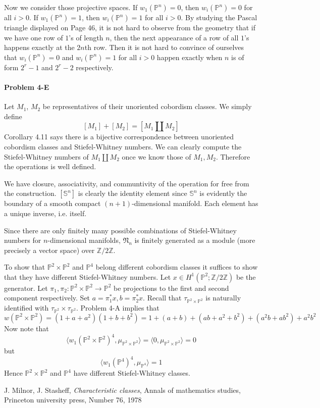 \documentclass[12pt]{article}
\theoremstyle{plain}
\theoremstyle{definition}
\newcommand{\IP}{\mathbb{P}}
\newcommand{\IS}{\mathbb{S}}
\newcommand{\IZ}{\mathbb{Z}}
\newcommand{\<}{\langle}
\renewcommand{\>}{\rangle}
\newcommand{\fN}{\mathfrak{N}}
\begin{document}
Now we consider those projective spaces. If $w_1(\IP^n) = 0$, then $w_i(\IP^n) = 0$ for all $i > 0$. If $w_1(\IP^n) = 1$, then $w_i(\IP^n) = 1$ for all $i > 0$. By studying the Pascal triangle displayed on Page 46, it is not hard to observe from the geometry that if we have one row of $1$'s of length $n$, then the next appearance of a row of all $1$'s happens exactly at the $2n$th row. Then it is not hard to convince of ourselves that $w_i(\IP^n) = 0$ and $w_i(\IP^n) = 1$ for all $i > 0$ happen exactly when $n$ is of form $2^r - 1$ and $2^r - 2$ respectively.  

\paragraph{Problem 4-E} Let $M_1$, $M_2$ be representatives of their unoriented cobordism classes. We simply define 
$$ [M_1] + [M_2] = [ M_1 \coprod M_2 ]$$
Corollary 4.11 says there is a bijective correspondence between unoriented cobordism classes and Stiefel-Whitney numbers. We can clearly compute the Stiefel-Whitney numbers of $M_1 \coprod M_2$ once we know those of $M_1, M_2$. Therefore the operations is well defined. 

We have closure, associativity, and communtivity of the operation for free from the construction. $[\IS^n]$ is clearly the identity element since $\IS^n$ is evidently the boundary of a smooth compact $(n+1)$-dimensional manifold. Each element has a unique inverse, i.e. itself. 

Since there are only finitely many possible combinations of Stiefel-Whitney numbers for $n$-dimensional manifolds, $\fN_n$ is finitely generated as a module (more precisely a vector space) over $\IZ/2\IZ$. 

To show that $\IP^2 \times \IP^2$ and $\IP^4$ belong different cobordism classes it suffices to show that they have different Stiefel-Whitney numbers. Let $x \in H^1(\IP^2; \IZ/2\IZ)$ be the generator. Let $\pi_1, \pi_2 : \IP^2 \times \IP^2 \to \IP^2$ be projections to the first and second component respectively. Set $a = \pi_1^* x, b = \pi_2^* x$. Recall that $\tau_{\IP^2 \times \IP^2}$ is naturally identified with $\tau_{\IP^2} \times \tau_{\IP^2}
$. Problem 4-A implies that 
$$ w(\IP^2 \times \IP^2) = (1 + a + a^2)(1 + b + b^2) = 1 + (a + b) + (ab + a^2 + b^2 ) + (a^2 b + a b^2) + a^2 b^2$$
Now note that 
$$ \< w_1(\IP^2 \times \IP^2)^4, \mu_{\IP^2 \times \IP^2} \> = \< 0, \mu_{\IP^2 \times \IP^2} \> = 0$$
but 
$$ \< w_1(\IP^4)^4, \mu_{\IP^4} \> = 1 $$
Hence $\IP^2 \times \IP^2$ and $\IP^4$ have different Stiefel-Whitney classes. 


\begin{thebibliography}{9}


  J. Milnor, J. Stasheff, \textit{Characteristic classes}, Annals of mathematics studies, Princeton university press, Number 76, 1978
\end{thebibliography}
\end{document}
